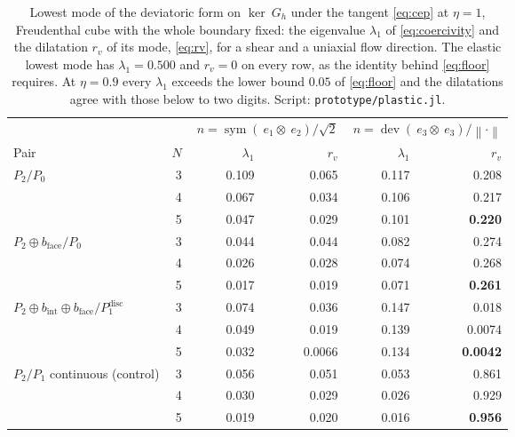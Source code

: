 \documentclass[11pt]{article}
\newcommand{\dev}{\operatorname{dev}}
\newcommand{\sym}{\operatorname{sym}}
\newcommand{\norm}[1]{\left\lVert #1 \right\rVert}
\newcommand{\code}[1]{\texttt{#1}}
\theoremstyle{definition}
\theoremstyle{plain}
\begin{document}
\begin{table}[tbp]
\centering
\caption{Lowest mode of the deviatoric form on $\ker ~G_h$ under the tangent
\eqref{eq:cep} at $\eta = 1$, Freudenthal cube with the whole boundary fixed: the eigenvalue
$\lambda_1$ of \eqref{eq:coercivity} and the dilatation $r_v$ of its mode,
\eqref{eq:rv}, for a shear and a uniaxial flow direction. The elastic lowest
mode has $\lambda_1 = 0.500$ and $r_v = 0$ on every row, as the identity
behind \eqref{eq:floor} requires. At $\eta = 0.9$ every $\lambda_1$ exceeds
the lower bound $0.05$ of \eqref{eq:floor} and the dilatations agree with those below to two digits.
Script: \code{prototype/plastic.jl}.}
\label{tab:plastic}
\begin{tabular}{@{}lrrrrr@{}}
\toprule
& & \multicolumn{2}{c}{$~n = \sym(~e_1 \otimes ~e_2)/\sqrt2$}
  & \multicolumn{2}{c}{$~n = \dev(~e_3 \otimes ~e_3)/\norm{\cdot}$} \\
\cmidrule(lr){3-4}\cmidrule(lr){5-6}
Pair & $N$ & $\lambda_1$ & $r_v$ & $\lambda_1$ & $r_v$ \\
\midrule
$P_2/P_0$                       & 3 & 0.109  & 0.065  & 0.117 & 0.208 \\
                                & 4 & 0.067  & 0.034  & 0.106 & 0.217 \\
                                & 5 & 0.047  & 0.029  & 0.101 & \textbf{0.220} \\
$P_2 \oplus b_{\mathrm{face}}/P_0$
                                & 3 & 0.044  & 0.044  & 0.082 & 0.274 \\
                                & 4 & 0.026  & 0.028  & 0.074 & 0.268 \\
                                & 5 & 0.017  & 0.019  & 0.071 & \textbf{0.261} \\
$P_2 \oplus b_{\mathrm{int}} \oplus b_{\mathrm{face}}/P_1^{\mathrm{disc}}$
                                & 3 & 0.074  & 0.036  & 0.147 & 0.018 \\
                                & 4 & 0.049  & 0.019  & 0.139 & 0.0074 \\
                                & 5 & 0.032  & 0.0066 & 0.134 & \textbf{0.0042} \\
$P_2/P_1$ continuous (control)  & 3 & 0.056  & 0.051  & 0.053 & 0.861 \\
                                & 4 & 0.030  & 0.029  & 0.026 & 0.929 \\
                                & 5 & 0.019  & 0.020  & 0.016 & \textbf{0.956} \\
\bottomrule
\end{tabular}
\end{table}
\end{document}
